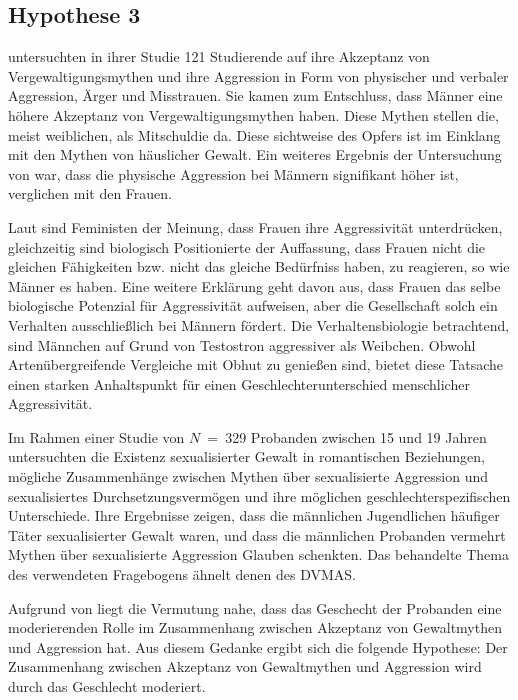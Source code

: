 \subsection{Hypothese 3}    \label{subsec_2.2.3}
\textcite{H2_u_3_Bhogal_2016} untersuchten in ihrer Studie 121 Studierende auf ihre Akzeptanz von Vergewaltigungsmythen und ihre Aggression in Form von physischer und verbaler Aggression, Ärger und Misstrauen. Sie kamen zum Entschluss, dass Männer eine höhere Akzeptanz von Vergewaltigungsmythen haben. Diese Mythen stellen die, meist weiblichen, als Mitschuldie da. Diese sichtweise des Opfers ist im Einklang mit den Mythen von häuslicher Gewalt. Ein weiteres Ergebnis der Untersuchung von \textcite{H2_u_3_Bhogal_2016} war, dass die physische Aggression bei Männern signifikant höher ist, verglichen mit den Frauen.

Laut \textcite{H3_MFUnterschied} sind Feministen der Meinung, dass Frauen ihre Aggressivität unterdrücken, gleichzeitig sind biologisch Positionierte der Auffassung, dass Frauen nicht die gleichen Fähigkeiten bzw. nicht das gleiche Bedürfniss haben, zu reagieren, so wie Männer es haben. Eine weitere Erklärung geht davon aus, dass Frauen das selbe biologische Potenzial für Aggressivität aufweisen, aber die Gesellschaft solch ein Verhalten ausschließlich bei Männern fördert. Die Verhaltensbiologie betrachtend, sind Männchen auf Grund von Testostron aggressiver als Weibchen. Obwohl Artenübergreifende Vergleiche mit Obhut zu genießen sind, bietet diese Tatsache einen starken Anhaltspunkt für einen Geschlechterunterschied menschlicher Aggressivität.

Im Rahmen einer Studie von $N$~=~329 Probanden zwischen 15 und 19 Jahren untersuchten \textcite{H3_2020} die Existenz sexualisierter Gewalt in romantischen Beziehungen, mögliche Zusammenhänge zwischen Mythen über sexualisierte Aggression und sexualisiertes Durchsetzungsvermögen und ihre möglichen geschlechterspezifischen Unterschiede. Ihre Ergebnisse zeigen, dass die männlichen Jugendlichen häufiger Täter sexualisierter Gewalt waren, und dass die männlichen Probanden vermehrt Mythen über sexualisierte Aggression Glauben schenkten. Das behandelte Thema des verwendeten Fragebogens ähnelt denen des DVMAS.

Aufgrund von \textcite{H2_u_3_Bhogal_2016, H3_MFUnterschied, H3_2020} liegt die Vermutung nahe, dass das Geschecht der Probanden eine moderierenden Rolle im Zusammenhang zwischen Akzeptanz von Gewaltmythen und Aggression hat. Aus diesem Gedanke ergibt sich die folgende Hypothese: Der Zusammenhang zwischen Akzeptanz von Gewaltmythen und Aggression wird durch das Geschlecht moderiert.

